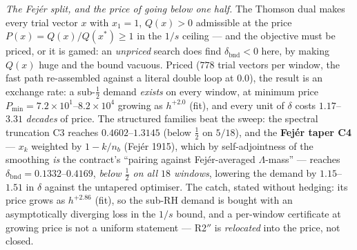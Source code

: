 \documentclass[11pt,a4paper]{article}
\begin{document}
\emph{The Fej\'er split, and the price of going below one half.} The Thomson
dual makes every trial vector $x$ with $x_1=1$, $Q(x)>0$ admissible at the
price $P(x)=Q(x)/Q(x^*)\ge1$ in the $1/s$ ceiling --- and the objective must be
priced, or it is gamed: an \emph{unpriced} search does find
$\delta_{\mathrm{bnd}}<0$ here, by making $Q(x)$ huge and the bound vacuous.
Priced ($778$ trial vectors per window, the fast path re-assembled against a
literal double loop at $0.0$), the result is an exchange rate: a sub-$\tfrac12$
demand \emph{exists} on every window, at minimum price
$P_{\min}=7.2\times10^{1}$--$8.2\times10^{4}$ growing as $h^{+2.0}$ (fit), and
every unit of $\delta$ costs $1.17$--$3.31$ \emph{decades} of price. The
structured families beat the sweep: the spectral truncation C3 reaches
$0.4602$--$1.3145$ (below $\tfrac12$ on $5/18$), and the \textbf{Fej\'er taper
C4} --- $x_k$ weighted by $1-k/n_b$ (Fej\'er 1915), which by self-adjointness
of the smoothing \emph{is} the contract's ``pairing against Fej\'er-averaged
$\Lambda$-mass'' --- reaches
$\delta_{\mathrm{bnd}}=\mathbf{0.1332}$--$\mathbf{0.4169}$, \emph{below
$\tfrac12$ on all $18$ windows}, lowering the demand by $1.15$--$1.51$ in
$\delta$ against the untapered optimiser. The catch, stated without hedging:
its price grows as $h^{+2.86}$ (fit), so the sub-RH demand is bought with an
asymptotically diverging loss in the $1/s$ bound, and a per-window certificate
at growing price is not a uniform statement --- R2$''$ is \emph{relocated} into
the price, not closed.
\end{document}
